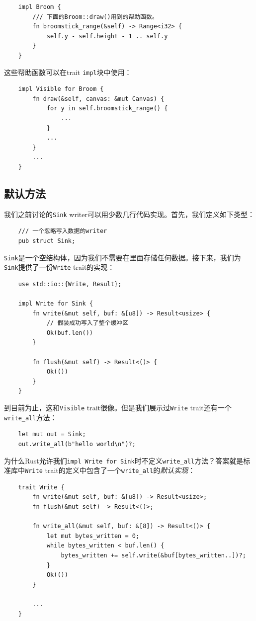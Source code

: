 \begin{verbatim}
    impl Broom {
        /// 下面的Broom::draw()用到的帮助函数。
        fn broomstick_range(&self) -> Range<i32> {
            self.y - self.height - 1 .. self.y
        }
    }
\end{verbatim}

这些帮助函数可以在trait \texttt{impl}块中使用：
\begin{verbatim}
    impl Visible for Broom {
        fn draw(&self, canvas: &mut Canvas) {
            for y in self.broomstick_range() {
                ...
            }
            ...
        }
        ...
    }
\end{verbatim}

\subsection{默认方法}
我们之前讨论的\texttt{Sink} writer可以用少数几行代码实现。首先，我们定义如下类型：
\begin{verbatim}
    /// 一个忽略写入数据的writer
    pub struct Sink;
\end{verbatim}

\texttt{Sink}是一个空结构体，因为我们不需要在里面存储任何数据。接下来，我们为\texttt{Sink}提供了一份\texttt{Write} trait的实现：
\begin{verbatim}
    use std::io::{Write, Result};

    impl Write for Sink {
        fn write(&mut self, buf: &[u8]) -> Result<usize> {
            // 假装成功写入了整个缓冲区
            Ok(buf.len())
        }

        fn flush(&mut self) -> Result<()> {
            Ok(())
        }
    }
\end{verbatim}

到目前为止，这和\texttt{Visible} trait很像。但是我们展示过\texttt{Write} trait还有一个\texttt{write\_all}方法：
\begin{verbatim}
    let mut out = Sink;
    out.write_all(b"hello world\n")?;
\end{verbatim}

为什么Rust允许我们\texttt{impl Write for Sink}时不定义\texttt{write\_all}方法？答案就是标准库中\texttt{Write} trait的定义中包含了一个\texttt{write\_all}的\emph{默认实现}：
\begin{verbatim}
    trait Write {
        fn write(&mut self, buf: &[u8]) -> Result<usize>;
        fn flush(&mut self) -> Result<()>;
        
        fn write_all(&mut self, buf: &[8]) -> Result<()> {
            let mut bytes_written = 0;
            while bytes_written < buf.len() {
                bytes_written += self.write(&buf[bytes_written..])?;
            }
            Ok(())            
        }

        ...
    }
\end{verbatim}

